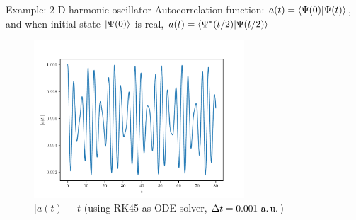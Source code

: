 \documentclass[12pt]{beamer}
\begin{document}
    \setcounter{figure}{5}
    \begin{frame}{Example: 2-D harmonic oscillator}
        Autocorrelation function: $a(t) = \braket{\Psi(0)}{\Psi(t)}$, and when initial state $\ket{\Psi(0)}$ is real, $a(t) = \braket{\Psi^*(t/2)}{\Psi(t/2)}$
        \begin{figure}
            \includegraphics[width=0.7\textwidth]{autocorr.pdf}
            \caption{$|a(t)|$ -- $t$ (using RK45 as ODE solver, $\Delta t = 0.001~\text{a.\,u.}$)}
        \end{figure}
    \end{frame}
\end{document}
